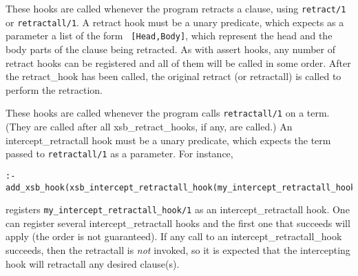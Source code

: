 \begin{description}
%
These hooks are called whenever the program retracts a clause, using
{\tt retract/1} or {\tt retractall/1}. A retract hook must be a unary
predicate, which expects as a parameter a list of the form {\tt
  [Head,Body]}, which represent the head and the body parts of the
clause being retracted. As with assert hooks, any number of retract
hooks can be registered and all of them will be called in some order.
After the retract\_hook has been called, the original retract (or
retractall) is called to perform the retraction.

%
These hooks are called whenever the program calls {\tt retractall/1}
on a term.  (They are called after all xsb\_retract\_hooks, if any,
are called.)  An intercept\_retractall hook must be a unary predicate,
which expects the term passed to {\tt retractall/1} as a
parameter. For instance,
\begin{verbatim}
:- add_xsb_hook(xsb_intercept_retractall_hook(my_intercept_retractall_hook(_))).
\end{verbatim}
registers {\tt my\_intercept\_retractall\_hook/1} as an intercept\_retractall
hook. One can register several intercept\_retractall hooks and the first
one that succeeds will apply (the order is not guaranteed).  If any
call to an intercept\_retractall\_hook succeeds, then the retractall is {\em not}
invoked, so it is expected that the intercepting hook will retractall any
desired clause(s).

\end{description}


